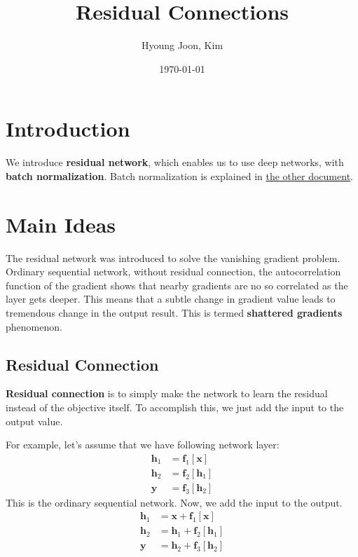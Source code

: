 \documentclass{article}
\title{Residual Connections}
\author{Hyoung Joon, Kim}
\date{\today}
\begin{document}
\maketitle
\tableofcontents
\newpage

\section{Introduction}
    We introduce \textbf{residual network}, which enables us to use deep networks, with \textbf{batch normalization}.
    Batch normalization is explained in \href{run:../regularization/normalization.pdf}{the other document}.

\section{Main Ideas}
    The residual network was introduced to solve the vanishing gradient problem. Ordinary sequential network,
    without residual connection, the autocorrelation function of the gradient shows that nearby gradients are
    no so correlated as the layer gets deeper. This means that a subtle change in gradient value leads to tremendous
    change in the output result. This is termed \textbf{shattered gradients} phenomenon.

    \subsection{Residual Connection}
        \textbf{Residual connection} is to simply make the network to learn the residual instead of the objective itself.
        To accomplish this, we just add the input to the output value.

        For example, let's assume that we have following network layer:
        \begin{align}
            \textbf{h}_1 &= \textbf{f}_1[\textbf{x}] \\
            \textbf{h}_2 &= \textbf{f}_2[\textbf{h}_1] \\
            \textbf{y} &= \textbf{f}_3[\textbf{h}_2]
        \end{align}
        This is the ordinary sequential network.
        Now, we add the input to the output.
        \begin{align}
            \textbf{h}_1 &= \textbf{x} + \textbf{f}_1[\textbf{x}] \\
            \textbf{h}_2 &= \textbf{h}_1 + \textbf{f}_2[\textbf{h}_1] \\
            \textbf{y} &= \textbf{h}_2 + \textbf{f}_3[\textbf{h}_2]
        \end{align}
        
\end{document}
